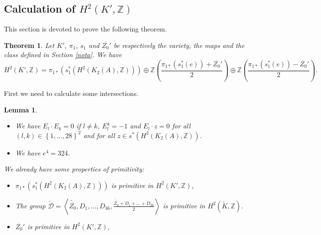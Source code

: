 \documentclass{alggeom}
\newcommand{\Z}{\mathbb{Z}}
\theoremstyle{plain}
\newtheorem{thm}[theorem]{Theorem}
\newtheorem{lemme}[theorem]{Lemma}
\theoremstyle{definition}
\theoremstyle{remark}
\begin{document}
\subsection{Calculation of $H^{2}(K',\Z)$}\label{basisinteK'}
This section is devoted to prove the following theorem.
\begin{thm}\label{fin}
Let $K'$, $\pi_1$, $s_1$ and $\overline{Z_0}'$ be respectively the variety, the maps and the class defined in Section \ref{nota}. 
We have $$H^{2}(K',\Z)=\pi_{1*}(s_{1}^{*}(H^2(K_2(A),\Z)))\oplus\Z\left(\frac{\pi_{1*}(s_{1}^{*}(e))+\overline{Z_{0}}'}{2}\right)\oplus\Z\left(\frac{\pi_{1*}(s_{1}^{*}(e))-\overline{Z_{0}}'}{2}\right).$$
\end{thm}

First we need to calculate some intersections.
\begin{lemme}\label{Fulton}
\begin{itemize}
\item[(i)]
We have $E_{l}\cdot E_{k}=0$ if $l\neq k$, $E_{l}^{4}=-1$ and $E_{l}\cdot z=0$ for all $(l,k)\in \left\{1,...,28\right\}^{2}$
and for all $z\in s^{*}(H^{2}(K_2(A),\Z))$.
\item[(ii)]
We have $e^4=324$.\newline
\end{itemize}
We already have some properties of primitivity:

\begin{itemize}
\item[(iii)]
$\pi_{1*}(s_1^{*}(H^{2}(K_{2}(A),\Z)))$ is primitive in $H^{2}(K',\Z)$,
\item[(iv)]
The group $\widetilde{\mathcal{D}}=\left\langle \widetilde{\overline{Z_0}},D_{1},...,D_{36},\frac{\widetilde{\overline{Z_0}}+D_{1}+...+D_{36}}{2}\right\rangle$ is primitive in $H^{2}(\widetilde{K},\Z)$.
\item[(v)]
$\overline{Z_{0}}'$ is primitive in $H^{2}(K',\Z)$,
\end{itemize}
\end{lemme}
\end{document}
